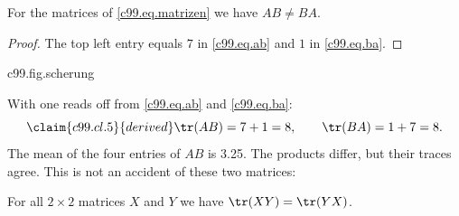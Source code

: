 \begin{proposition}\label{c99.prop.reihenfolge}
  For the matrices of \eqref{c99.eq.matrizen} we have $AB \neq BA$.
\end{proposition}
\begin{proof}
  The top left entry equals $7$ in \eqref{c99.eq.ab} and $1$ in
  \eqref{c99.eq.ba}.
\end{proof}

\begin{tpcfigure}{c99.fig.scherung}
  \caption{The matrix $A$ as a map of the plane: the point $(x,y)$ goes to
    $(x+2y,\,y)$. The dashed unit square becomes the hatched parallelogram with
    corners $(0,0)$, $(1,0)$, $(3,1)$ and $(2,1)$; the base stays where it is and
    the top edge moves two units to the right. The German caption of this figure
    is long on purpose, so that the line breaking of long German compounds is
    tested in print and on the web; the English caption is kept at a comparable
    length so that both editions exercise a caption of several lines.}
\end{tpcfigure}


With  one reads off from \eqref{c99.eq.ab} and \eqref{c99.eq.ba}:
\begin{equation}\label{c99.eq.spuren}\claim{c99.cl.5}{derived}
  \tr(AB) = 7 + 1 = 8,
  \qquad
  \tr(BA) = 1 + 7 = 8.
\end{equation}
The mean of the four entries of $AB$ is \num[c99.cl.19]{3.25}{}.
The products differ, but their traces agree. This is not an accident of these two
matrices:

\begin{theorem}\label{c99.thm.spur}
  For all $2\times 2$ matrices $X$ and $Y$ we have $\tr(XY) = \tr(YX)$.
\end{theorem}

